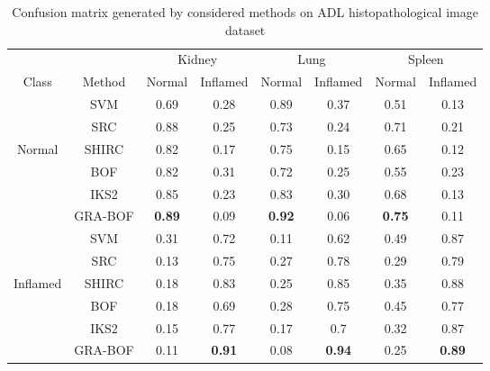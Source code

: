 \begin{table}[h]
\centering
\caption[Confusion matrix generated by considered methods on ADL histopathological image dataset]{\fontsize{10pt}{12pt}\selectfont Confusion matrix generated by considered methods on ADL histopathological image dataset}
    \label{ch5:tab:cm}
\renewcommand{\arraystretch}{1.2}
{\scriptsize 
\begin{tabular}{|c|c|c|c|c|c|c|c|}
\hline
&  & \multicolumn{2}{c|}{Kidney}& \multicolumn{2}{c|}{Lung} & \multicolumn{2}{c|}{Spleen}\\
\cline{3-8}
Class &Method & Normal  & Inflamed & Normal  & Inflamed & Normal  & Inflamed\\
\hline
&SVM& 0.69 & 0.28 & 0.89 & 0.37 & 0.51 & 0.13 \\
&SRC & 0.88&0.25&0.73&0.24&0.71&0.21\\
Normal &SHIRC &0.82&0.17&0.75&0.15&0.65&0.12\\
&BOF&0.82&0.31&0.72&0.25&0.55&0.23\\
&IKS2&0.85&0.23&0.83&0.30&0.68&0.13\\
&GRA-BOF&\textbf{0.89}&0.09&\textbf{0.92}&0.06&\textbf{0.75}&0.11\\
\hline

&SVM& 0.31&0.72&0.11&0.62&0.49&0.87\\
&SRC&0.13&0.75&0.27&0.78&0.29&0.79\\
Inflamed &SHIRC&0.18&0.83&0.25&0.85&0.35&0.88\\
&BOF&0.18&0.69&0.28&0.75&0.45&0.77\\
&IKS2&0.15&0.77&0.17&0.7&0.32&0.87\\
&GRA-BOF&0.11&\textbf{0.91}&0.08&\textbf{0.94}&0.25&\textbf{0.89}\\

\hline
\end{tabular}
}
\end{table}

